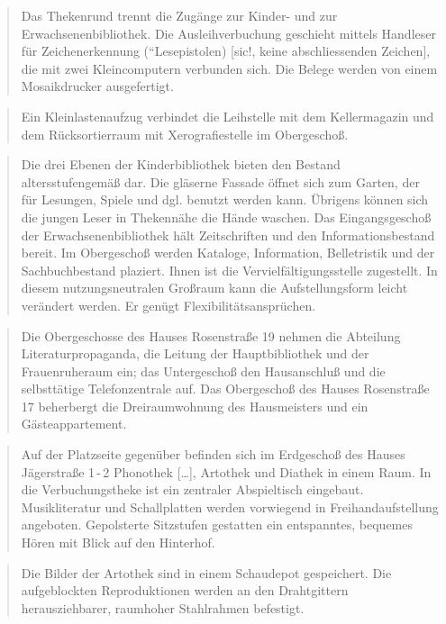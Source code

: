 \documentclass[a4paper,
fontsize=11pt,
oneside,
numbers=noperiodatend,
parskip=half-,
bibliography=totoc,
final
]{scrartcl}
\begin{document}
\begin{quote}
Das Thekenrund trennt die Zugänge zur Kinder- und zur
Erwachsenenbibliothek. Die Ausleihverbuchung geschieht mittels Handleser
für Zeichenerkennung (``Lesepistolen) {[}sic!, keine abschliessenden
Zeichen{]}, die mit zwei Kleincomputern verbunden sich. Die Belege
werden von einem Mosaikdrucker ausgefertigt.
\end{quote}

\begin{quote}
Ein Kleinlastenaufzug verbindet die Leihstelle mit dem Kellermagazin und
dem Rücksortierraum mit Xerografiestelle im Obergeschoß.
\end{quote}

\begin{quote}
Die drei Ebenen der Kinderbibliothek bieten den Bestand
altersstufengemäß dar. Die gläserne Fassade öffnet sich zum Garten, der
für Lesungen, Spiele und dgl. benutzt werden kann. Übrigens können sich
die jungen Leser in Thekennähe die Hände waschen. Das Eingangsgeschoß
der Erwachsenenbibliothek hält Zeitschriften und den Informationsbestand
bereit. Im Obergeschoß werden Kataloge, Information, Belletristik und
der Sachbuchbestand plaziert. Ihnen ist die Vervielfältigungsstelle
zugestellt. In diesem nutzungsneutralen Großraum kann die
Aufstellungsform leicht verändert werden. Er genügt
Flexibilitätsansprüchen.
\end{quote}

\begin{quote}
Die Obergeschosse des Hauses Rosenstraße 19 nehmen die Abteilung
Literaturpropaganda, die Leitung der Hauptbibliothek und der
Frauenruheraum ein; das Untergeschoß den Hausanschluß und die
selbsttätige Telefonzentrale auf. Das Obergeschoß des Hauses Rosenstraße
17 beherbergt die Dreiraumwohnung des Hausmeisters und ein
Gästeappartement.
\end{quote}

\begin{quote}
Auf der Platzseite gegenüber befinden sich im Erdgeschoß des Hauses
Jägerstraße 1\,-\,2 Phonothek {[}\ldots{}{]}, Artothek und Diathek in
einem Raum. In die Verbuchungstheke ist ein zentraler Abspieltisch
eingebaut. Musikliteratur und Schallplatten werden vorwiegend in
Freihandaufstellung angeboten. Gepolsterte Sitzstufen gestatten ein
entspanntes, bequemes Hören mit Blick auf den Hinterhof.
\end{quote}

\begin{quote}
Die Bilder der Artothek sind in einem Schaudepot gespeichert. Die
aufgeblockten Reproduktionen werden an den Drahtgittern herausziehbarer,
raumhoher Stahlrahmen befestigt.
\end{quote}
\end{document}

